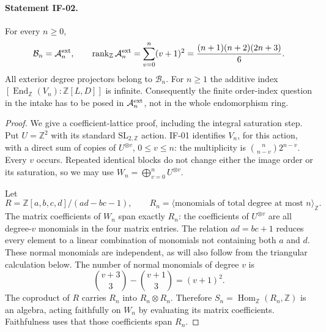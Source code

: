 \paragraph{Statement IF-02.}
For every $n\geq0$,
\[
 \mathcal B_n=\mathcal A_n^{\rm ext},\qquad
 \operatorname{rank}_{\mathbb Z}\mathcal A_n^{\rm ext}
 =\sum_{v=0}^n(v+1)^2=\frac{(n+1)(n+2)(2n+3)}6.
\]
All exterior degree projectors belong to $\mathcal B_n$. For $n\geq1$
the additive index
$[\operatorname{End}_{\mathbb Z}(V_n):\mathbb Z[L,D]]$ is infinite.
Consequently the finite order-index question in the intake has to be
posed in $\mathcal A_n^{\rm ext}$, not in the whole endomorphism ring.

\begin{proof}
We give a coefficient-lattice proof, including the integral saturation
step. Put $U=\mathbb Z^2$ with its standard $\mathrm{SL}_{2,\mathbb Z}$
action. IF-01 identifies $V_n$, for this action, with a direct sum of
copies of $U^{\otimes v}$, $0\leq v\leq n$: the multiplicity is
$\binom n{n-v}2^{n-v}$. Every $v$ occurs. Repeated identical blocks do
not change either the image order or its saturation, so we may use
$W_n=\bigoplus_{v=0}^n U^{\otimes v}$.

Let
\[
 R=\mathbb Z[a,b,c,d]/(ad-bc-1),\qquad
 R_n=\langle\text{monomials of total degree at most }n\rangle_{\mathbb Z}.
\]
The matrix coefficients of $W_n$ span exactly $R_n$: the coefficients
of $U^{\otimes v}$ are all degree-$v$ monomials in the four matrix
entries. The relation $ad=bc+1$ reduces every element to a linear
combination of monomials not containing both $a$ and $d$. These normal
monomials are independent, as will also follow from the triangular
calculation below. The number of normal monomials of degree $v$ is
\[
 \binom{v+3}{3}-\binom{v+1}{3}=(v+1)^2.
\]
The coproduct of $R$ carries $R_n$ into $R_n\otimes R_n$. Therefore
$S_n=\operatorname{Hom}_{\mathbb Z}(R_n,\mathbb Z)$ is an algebra, acting
faithfully on $W_n$ by evaluating its matrix coefficients. Faithfulness
uses that those coefficients span $R_n$.


\end{proof}
